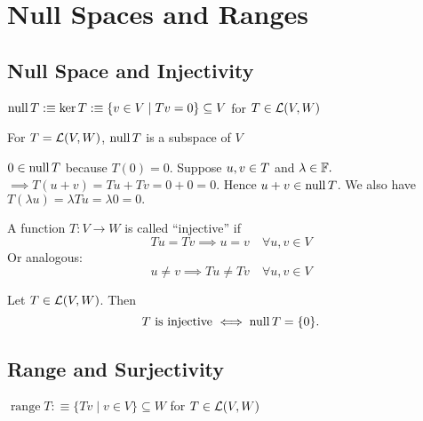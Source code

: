 \section{Null Spaces and Ranges}

\subsection{Null Space and Injectivity}

\begin{mydef} 
  $\operatorname{null} T :\equiv \ker T :\equiv \{ v \in V \mid Tv=0\} \subseteq V$ for $T \in {\mathcal{L}(V,W)}$
\end{mydef}

\setcounter{thm}{12}
\begin{thm} 
  For $T=\mathcal{L}(V, W)$, $\operatorname{null} T$ is a subspace of $V$ 
\end{thm}
\begin{prf}
  $0 \in \operatorname{null} T$ because $T(0) = 0$. Suppose $u,v \in \null T$ and $\lambda \in \mathbb{F}.$ $\implies T(u+v)=Tu+Tv=0+0=0.$ Hence $u+v \in \operatorname{null} T$. We also have $T(\lambda u)= \lambda Tu = \lambda 0 = 0.$
\end{prf}

\setcounter{thm}{13}
\begin{mydef} [injective]
  A function $T: V \to W$ is called ``injective'' if
  \begin{equation}
    Tu = Tv \implies u = v \quad \forall u,v \in V
  \end{equation}
  Or analogous:
  \begin{equation}
    u \neq v \implies Tu \neq Tv \quad \forall u,v \in V
  \end{equation}
\end{mydef}

\setcounter{thm}{14}
\begin{thm} 
  \label{thm: injectivity iff null space equals zero-set}
  Let $T \in \mathcal{L}(V,W)$. Then
  \begin{equation}
    T $ is injective $ \iff \mynull T = \{0 \}.
  \end{equation}
\end{thm}

\subsection{Range and Surjectivity}

\setcounter{thm}{15}
\begin{mydef} [range]
  $\operatorname{range}T :\equiv \{Tv \mid v \in V\} \subseteq W$ for $T \in {\mathcal{L}(V,W)}$
\end{mydef}

